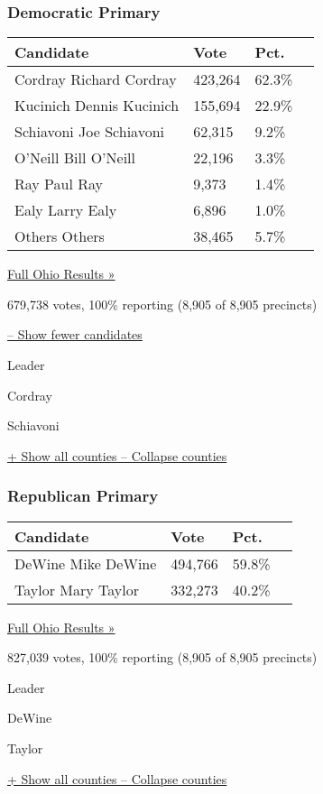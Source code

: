\hypertarget{democratic-primary-1}{%
\subsubsection{Democratic Primary}\label{democratic-primary-1}}

\begin{longtable}[]{@{}llll@{}}
\toprule
Candidate & Vote & Pct. &\tabularnewline
\midrule
\endhead
 Cordray Richard Cordray & 423,264 & 62.3\% &\tabularnewline
 Kucinich Dennis Kucinich & 155,694 & 22.9\% &\tabularnewline
 Schiavoni Joe Schiavoni & 62,315 & 9.2\% &\tabularnewline
 O'Neill Bill O'Neill & 22,196 & 3.3\% &\tabularnewline
 Ray Paul Ray & 9,373 & 1.4\% &\tabularnewline
 Ealy Larry Ealy & 6,896 & 1.0\% &\tabularnewline
 Others Others & 38,465 & 5.7\% &\tabularnewline
\bottomrule
\end{longtable}

\href{https://www.nytimes3xbfgragh.onion/elections/results/ohio}{Full
Ohio Results »}

679,738 votes, 100\% reporting (8,905 of 8,905 precincts)

\protect\hyperlink{}{-- Show fewer candidates}

Leader

 Cordray

 Schiavoni

\protect\hyperlink{}{+ Show all counties -- Collapse counties}

\hypertarget{republican-primary-1}{%
\subsubsection{Republican Primary}\label{republican-primary-1}}

\begin{longtable}[]{@{}llll@{}}
\toprule
Candidate & Vote & Pct. &\tabularnewline
\midrule
\endhead
 DeWine Mike DeWine & 494,766 & 59.8\% &\tabularnewline
 Taylor Mary Taylor & 332,273 & 40.2\% &\tabularnewline
\bottomrule
\end{longtable}

\href{https://www.nytimes3xbfgragh.onion/elections/results/ohio}{Full
Ohio Results »}

827,039 votes, 100\% reporting (8,905 of 8,905 precincts)

Leader

 DeWine

 Taylor

\protect\hyperlink{}{+ Show all counties -- Collapse counties}

